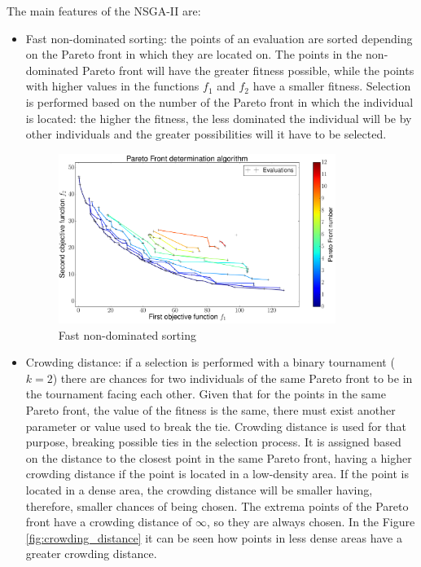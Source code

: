 \newpage
The main features of the NSGA-II are:
\begin{itemize}
    \item Fast non-dominated sorting: the points of an evaluation are sorted depending on the Pareto front in which they are located on. The points in the non-dominated Pareto front will have the greater fitness possible, while the points with higher values in the functions $f_1$ and $f_2$ have a smaller fitness. Selection is performed based on the number of the Pareto front in which the individual is located: the higher the fitness, the less dominated the individual will be by other individuals and the greater possibilities will it have to be selected.
    \begin{figure}[h!]
        \centering
        \includegraphics[width=0.85\textwidth]{Figures/2/fastNonDominatedSort.pdf}
        \caption{Fast non-dominated sorting}
        \label{fig:fast-nondominated-sorting}
    \end{figure}
    \item Crowding distance: if a selection is performed with a binary tournament ($k=2$) there are chances for two individuals of the same Pareto front to be in the tournament facing each other. Given that for the points in the same Pareto front, the value of the fitness is the same, there must exist another parameter or value used to break the tie. Crowding distance is used for that purpose, breaking possible ties in the selection process. It is assigned based on the distance to the closest point in the same Pareto front, having a higher crowding distance if the point is located in a low-density area. If the point is located in a dense area, the crowding distance will be smaller having, therefore, smaller chances of being chosen. The extrema points of the Pareto front have a crowding distance of $\infty$, so they are always chosen. In the Figure \ref{fig:crowding_distance} it can be seen how points in less dense areas have a greater crowding distance.

\end{itemize}
